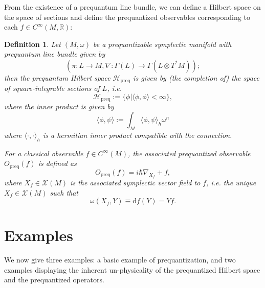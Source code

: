 \documentclass{tufte-handout}
\newtheorem{defn}{Definition}
\def\d{\mathrm{d}}
\begin{document}
From the existence of a prequantum line bundle, we can define a Hilbert space on the space of sections and define the prequantized observables corresponding to each $f \in C^\infty(M,\mathbb{R})$:
\begin{defn}
Let $(M,\omega)$ be a prequantizable symplectic manifold with prequantum line bundle given by
$$
(\pi: L \to M, \nabla: \Gamma(L) \to \Gamma(L \otimes T^*M));
$$
then the \emph{prequantum Hilbert space} $\mathcal{H}_{\mbox{preq}}$ is given by (the completion of) the space of square-integrable sections of $L$, i.e.
$$
\mathcal{H}_{\mbox{preq}} := \{\phi | \langle\phi,\phi\rangle < \infty \},
$$
where the inner product is given by
$$
\langle \phi, \psi \rangle := \int_M \langle \phi,\psi \rangle_h \omega^n
$$
where $\langle \cdot,\cdot \rangle_h$ is a hermitian inner product compatible with the connection. %

For a classical observable $f \in C^\infty(M)$, the associated prequantized observable $O_{\mbox{preq}}(f)$ is defined as
$$
O_{\mbox{preq}}(f) = i\hbar\nabla_{X_f} + f,  %
$$
where $X_f \in \mathcal{X}(M)$ is the associated symplectic vector field to $f$, i.e. the unique $X_f \in \mathcal{X}(M)$ such that
$$
\omega(X_f,Y) \equiv \d f (Y) = Yf.
$$
\end{defn}


\section{Examples}
We now give three examples: a basic example of prequantization, and two examples displaying the inherent un-physicality of the prequantized Hilbert space and the prequantized operators.
\end{document}
